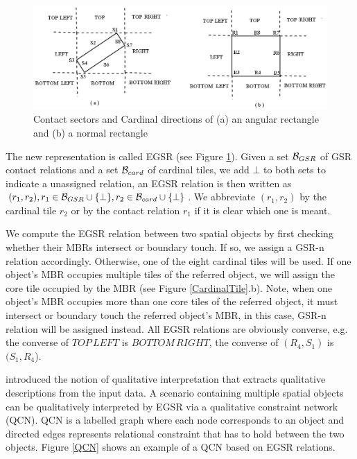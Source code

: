 \documentclass[letterpaper]{article}
\begin{document}
\begin{figure}[h!]
\centering\includegraphics[scale=0.25]{EGSR-relations.png}\caption{Contact sectors and Cardinal directions of (a) an angular rectangle and (b) a normal rectangle}
\label{EGSR}
\end{figure}
The new representation is called EGSR (see Figure \ref{EGSR}). Given a set ${\cal B}_{GSR}$ of GSR contact relations and a set ${\cal B}_{card}$ of cardinal tiles,  we add $\bot$ to both sets to indicate a unassigned relation, an EGSR relation is then written as $(r_1, r_2), r_1 \in {\cal B}_{GSR}\cup \{\bot\}, r_2 \in {\cal B}_{card}\cup \{\bot\}$. We abbreviate $(r_1,r_2)$ by the cardinal tile $r_2$ or by the contact relation $r_1$ if it is clear which one is meant. 

We compute the EGSR relation between two spatial objects by first checking whether their MBRs intersect or boundary touch. If so, we assign a GSR-n relation accordingly. Otherwise, one of the eight cardinal tiles will be used. If one object's MBR occupies multiple tiles of the referred object, we will assign the core tile occupied by the MBR (see Figure \ref{CardinalTile}.b). Note, when one object's MBR occupies more than one core tiles of the referred object, it must intersect or boundary touch the referred object's MBR, in this case, GSR-n relation will be assigned instead. All EGSR relations are obviously converse, e.g. the converse of $TOP\,LEFT$ is $BOTTOM\,RIGHT$, the converse of $(R_4, S_1)$ is $(S_1,R_4$).

\cite{wallgrun2010qualitative} introduced the notion of qualitative interpretation that extracts qualitative descriptions from the input data. A scenario containing multiple spatial objects can be qualitatively interpreted by EGSR via a qualitative constraint network (QCN). QCN is a labelled graph where each node corresponds to an object and directed edges represents relational constraint that has to hold between the two objects. 
Figure \ref{QCN} shows an example of a QCN based on EGSR relations.
\end{document}
